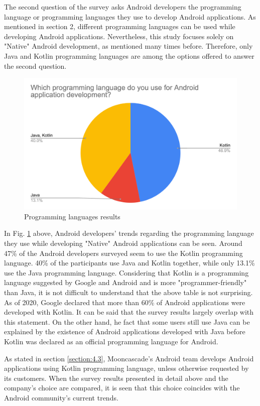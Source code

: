 The second question of the survey asks Android developers the programming language or programming languages they use to develop Android applications. As mentioned in section 2, different programming languages can be used while developing Android applications. Nevertheless, this study focuses solely on "Native" Android development, as mentioned many times before. Therefore, only Java and Kotlin programming languages are among the options offered to answer the second question.
\begin{figure}[ht!]
    \centering
    \includegraphics[scale=0.3]{figures/programming_language.png}
    \caption{Programming languages results}
    \label{fig:programming_languages}
\end{figure}

In Fig. \ref{fig:programming_languages} above, Android developers' trends regarding the programming language they use while developing "Native" Android applications can be seen. Around 47\% of the Android developers surveyed seem to use the Kotlin programming language. 40\% of the participants use Java and Kotlin together, while only 13.1\% use the Java programming language. Considering that Kotlin is a programming language suggested by Google and Android and is more "programmer-friendly" than Java, it is not difficult to understand that the above table is not surprising. As of 2020, Google declared that more than 60\% of Android applications were developed with Kotlin. It can be said that the survey results largely overlap with this statement\cite{29}. On the other hand, he fact that some users still use Java can be explained by the existence of Android applications developed with Java before Kotlin was declared as an official programming language for Android.

As stated in section \ref{section:4.3}, Mooncascade's Android team develops Android applications using Kotlin programming language, unless otherwise requested by its customers. When the survey results presented in detail above and the company's choice are compared, it is seen that this choice coincides with the Android community’s current trends.